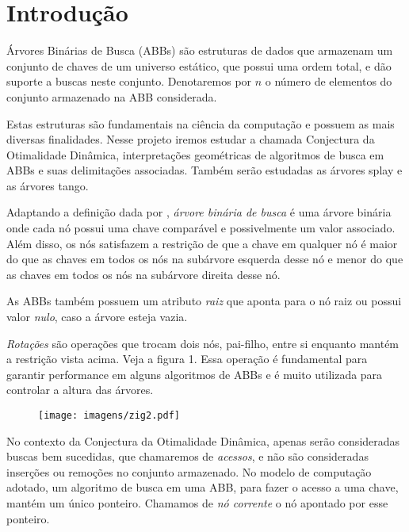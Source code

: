 
\chapter{Introdução}
\label{cap:introducao}

Árvores Binárias de Busca (ABBs) são estruturas de dados que armazenam um conjunto de chaves de um universo estático, que possui uma ordem total, e dão suporte a buscas neste conjunto. Denotaremos por $n$ o número de elementos do conjunto armazenado na ABB considerada.

Estas estruturas são fundamentais na ciência da computação e possuem as mais diversas finalidades. Nesse projeto iremos estudar a chamada Conjectura da Otimalidade Dinâmica, interpretações geométricas de algoritmos de busca em ABBs e suas delimitações associadas. Também serão estudadas as árvores splay e as árvores tango.

Adaptando a definição dada por \cite{Sedgewick}, \textit{árvore binária de busca} é uma árvore binária onde cada nó possui uma chave comparável e possivelmente um valor associado. Além disso, os nós satisfazem a restrição de que a chave em qualquer nó é maior do que as chaves em todos os nós na subárvore esquerda desse nó e menor do que as chaves em todos os nós na subárvore direita desse nó.

As ABBs também possuem um atributo \textit{raiz} que aponta para o nó raiz ou possui valor \textit{nulo}, caso a árvore esteja vazia.

\textit{Rotações} são operações que trocam dois nós, pai-filho, entre si enquanto mantém a restrição vista acima. Veja a figura 1. Essa operação é fundamental para garantir performance em alguns algoritmos de ABBs e é muito utilizada para controlar a altura das árvores.


\begin{figure}[htbp]
    \centering
    \texttt{[image: imagens/zig2.pdf]}
    \label{fig:imagem}
\end{figure}

No contexto da Conjectura da Otimalidade Dinâmica, apenas serão consideradas buscas bem sucedidas, que chamaremos de \textit{acessos}, e não são consideradas inserções ou remoções no conjunto armazenado. No modelo de computação adotado, um algoritmo de busca em uma ABB, para fazer o acesso a uma chave, mantém um único ponteiro. Chamamos de \textit{nó corrente} o nó apontado por esse ponteiro. 

